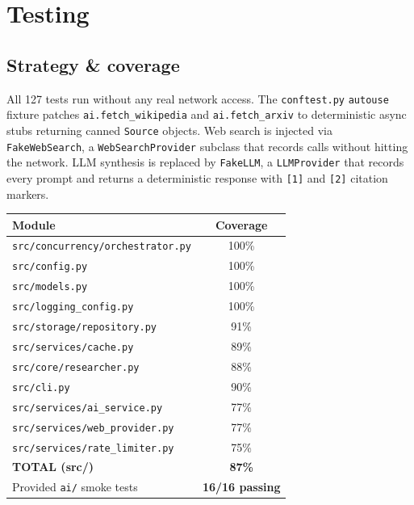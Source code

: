 \documentclass[11pt,a4paper]{article}
\begin{document}
\section{Testing}\label{sec:testing}

\subsection{Strategy \& coverage}

All 127 tests run without any real network access. The \texttt{conftest.py}
\texttt{autouse} fixture patches \texttt{ai.fetch\_wikipedia} and
\texttt{ai.fetch\_arxiv} to deterministic async stubs returning canned
\texttt{Source} objects. Web search is injected via \texttt{FakeWebSearch}, a
\texttt{WebSearchProvider} subclass that records calls without hitting the network.
LLM synthesis is replaced by \texttt{FakeLLM}, a \texttt{LLMProvider} that records
every prompt and returns a deterministic response with \texttt{[1]} and \texttt{[2]}
citation markers.

\begin{center}\small\sloppy
\begin{tabular}{lc}
\toprule
\textbf{Module} & \textbf{Coverage} \\
\midrule
\texttt{src/concurrency/orchestrator.py} & 100\% \\
\texttt{src/config.py}                   & 100\% \\
\texttt{src/models.py}                   & 100\% \\
\texttt{src/logging\_config.py}          & 100\% \\
\texttt{src/storage/repository.py}       &  91\% \\
\texttt{src/services/cache.py}           &  89\% \\
\texttt{src/core/researcher.py}          &  88\% \\
\texttt{src/cli.py}                      &  90\% \\
\texttt{src/services/ai\_service.py}     &  77\% \\
\texttt{src/services/web\_provider.py}   &  77\% \\
\texttt{src/services/rate\_limiter.py}   &  75\% \\
\midrule
\textbf{TOTAL (src/)}                    & \textbf{87\%} \\
\midrule
Provided \texttt{ai/} smoke tests        & \textbf{16/16 passing} \\
\bottomrule
\end{tabular}
\end{center}
\end{document}
